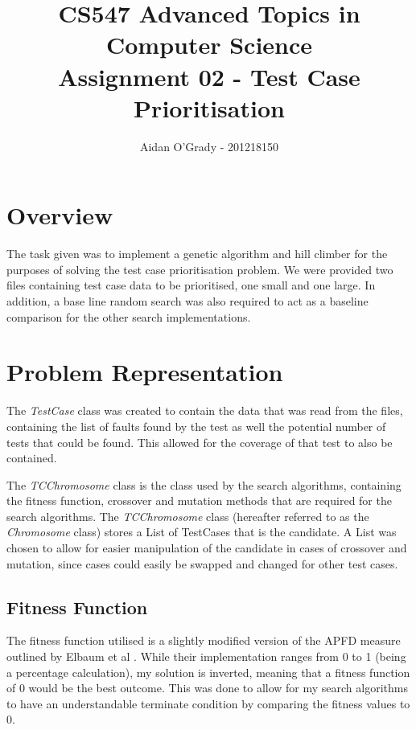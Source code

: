 \documentclass[11pt, a4paper]{article}
\begin{document}
\title{CS547 Advanced Topics in Computer Science\\
\large{Assignment 02 - Test Case Prioritisation}}
\author{Aidan O'Grady - 201218150}
\date{}
\maketitle

\section{Overview}
\label{sec:overview}
The task given was to implement a genetic algorithm and hill climber for the
purposes of solving the test case prioritisation problem. We were provided two
files containing test case data to be prioritised, one small and one large. In
addition, a base line random search was also required to act as a baseline
comparison for the other search implementations.

\section{Problem Representation}
\label{sec:problem_representation}
The \emph{TestCase} class was created to contain the data that was read from the
files, containing the list of faults found by the test as well the potential
number of tests that could be found. This allowed for the coverage of that test
to also be contained.

The \emph{TCChromosome} class is the class used by the search algorithms,
containing the fitness function, crossover and mutation methods that are required
for the search algorithms. The \emph{TCChromosome} class (hereafter referred to
as the \emph{Chromosome} class) stores a List of TestCases that is the
candidate. A List was chosen to allow for easier manipulation of the candidate
in cases of crossover and mutation, since cases could easily be swapped and
changed for other test cases.

\subsection{Fitness Function}
\label{sub:fitness_function}
The fitness function utilised is a slightly modified version of the APFD measure
outlined by Elbaum et al \cite[Section~4.1]{Elbaum:2002:TCP:506201.506205}.
While their implementation ranges from 0 to 1 (being a percentage calculation),
my solution is inverted, meaning that a fitness function of 0 would be the best
outcome. This was done to allow for my search algorithms to have an
understandable terminate condition by comparing the fitness values to 0. 
\end{document}
